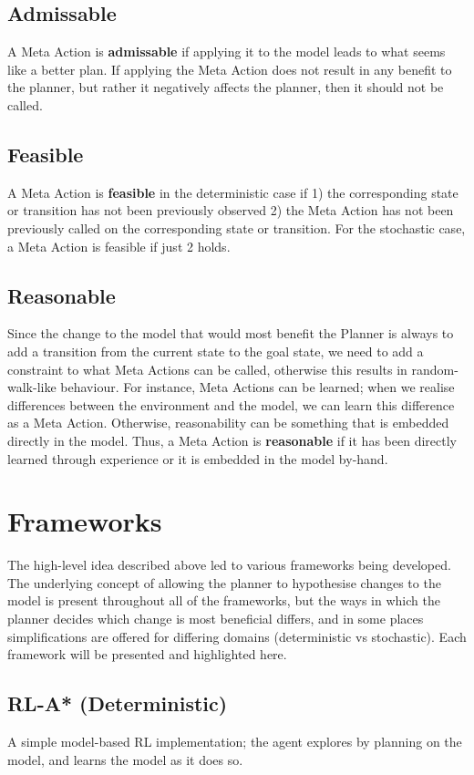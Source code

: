 \subsection{Admissable}
A Meta Action is \textbf{admissable} if applying it to the model leads to what seems like a better plan. If applying the Meta Action does not result in any benefit to the planner, but rather it negatively affects the planner, then it should not be called.
\subsection{Feasible}
A Meta Action is \textbf{feasible} in the deterministic case if 1) the corresponding state or transition has not been previously observed 2) the Meta Action has not been previously called on the corresponding state or transition. For the stochastic case, a Meta Action is feasible if just 2 holds.
\subsection{Reasonable}
Since the change to the model that would most benefit the Planner is always to add a transition from the current state to the goal state, we need to add a constraint to what Meta Actions can be called, otherwise this results in random-walk-like behaviour.
For instance, Meta Actions can be learned; when we realise differences between the environment and the model, we can learn this difference as a Meta Action. Otherwise, reasonability can be something that is embedded directly in the model. Thus, a Meta Action is \textbf{reasonable} if it has been directly learned through experience or it is embedded in the model by-hand.
\section{Frameworks}
The high-level idea described above led to various frameworks being developed. The underlying concept of allowing the planner to hypothesise changes to the model is present throughout all of the frameworks, but the ways in which the planner decides which change is most beneficial differs, and in some places simplifications are offered for differing domains (deterministic vs stochastic). Each framework will be presented and highlighted here.
\subsection{RL-A* (Deterministic)}
A simple model-based RL implementation; the agent explores by planning on the model, and learns the model as it does so.
